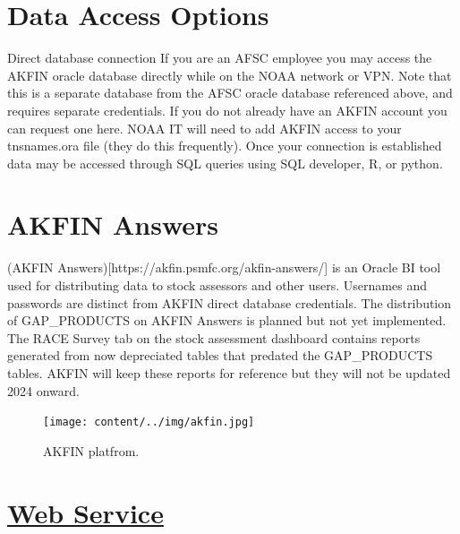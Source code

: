 \documentclass[
  letterpaper,
  oneside,
  open=any]{scrbook}
\begin{document}
\section*{Data Access Options}\label{data-access-options}


Direct database connection If you are an AFSC employee you may access
the AKFIN oracle database directly while on the NOAA network or VPN.
Note that this is a separate database from the AFSC oracle database
referenced above, and requires separate credentials. If you do not
already have an AKFIN account you can request one here. NOAA IT will
need to add AKFIN access to your tnsnames.ora file (they do this
frequently). Once your connection is established data may be accessed
through SQL queries using SQL developer, R, or python.

\section*{AKFIN Answers}\label{akfin-answers}


(AKFIN Answers){[}https://akfin.psmfc.org/akfin-answers/{]} is an Oracle
BI tool used for distributing data to stock assessors and other users.
Usernames and passwords are distinct from AKFIN direct database
credentials. The distribution of GAP\_PRODUCTS on AKFIN Answers is
planned but not yet implemented. The RACE Survey tab on the stock
assessment dashboard contains reports generated from now depreciated
tables that predated the GAP\_PRODUCTS tables. AKFIN will keep these
reports for reference but they will not be updated 2024 onward.

\begin{figure}[H]

{\centering \texttt{[image: content/../img/akfin.jpg]}

}

\caption{AKFIN platfrom.}

\end{figure}%

\section*{\texorpdfstring{\href{https://afsc-gap-products.github.io/gap_products/content/akfin-api-r.html}{Web
Service}}{Web Service}}\label{web-service}
\end{document}
